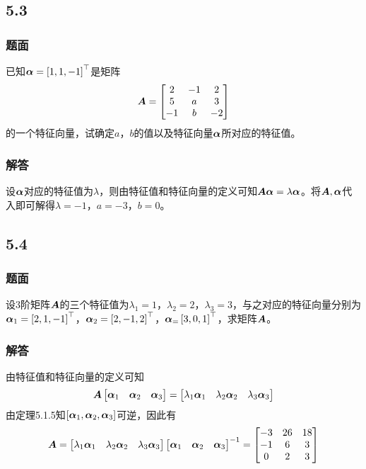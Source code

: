 \documentclass[9pt,xcolor=svgnames]{beamer} %
\begin{document}
\subsection*{5.3}
\begin{frame}
    \frametitle{题面}
    已知\(\boldsymbol{\alpha}=\left[ 1,1,-1 \right]^\top\)是矩阵
    \begin{equation*}
        \boldsymbol{A}=
        \begin{bmatrix}
            2  & -1 & 2  \\
            5  & a  & 3  \\
            -1 & b  & -2
        \end{bmatrix}
    \end{equation*}
    的一个特征向量，试确定\(a\)，\(b\)的值以及特征向量\(\boldsymbol{\alpha}\)所对应的特征值。
\end{frame}

\begin{frame}
    \frametitle{解答}
    设\(\boldsymbol{\alpha}\)对应的特征值为\(\lambda\)，则由特征值和特征向量的定义可知\(\boldsymbol{A}\boldsymbol{\alpha}=\lambda\boldsymbol{\alpha}\)。将\(\boldsymbol{A},\boldsymbol{\alpha}\)代入即可解得\(\lambda=-1\)，\(a=-3\)，\(b=0\)。
\end{frame}

\subsection*{5.4}
\begin{frame}
    \frametitle{题面}
    设\(3\)阶矩阵\(\boldsymbol{A}\)的三个特征值为\(\lambda_1=1\)，\(\lambda_2=2\)，\(\lambda_3=3\)，与之对应的特征向量分别为\(\boldsymbol{\alpha}_1=\left[ 2,1,-1 \right]^\top\)，\(\boldsymbol{\alpha}_2=\left[ 2,-1,2 \right]^\top\)，\(\boldsymbol{\alpha}_=\left[ 3,0,1 \right]^\top\)，求矩阵\(\boldsymbol{A}\)。
\end{frame}

\begin{frame}
    \frametitle{解答}
    由特征值和特征向量的定义可知
    \begin{equation*}
        \boldsymbol{A}\begin{bmatrix}\boldsymbol{\alpha}_1&\boldsymbol{\alpha}_2&\boldsymbol{\alpha}_3\end{bmatrix}=\begin{bmatrix}\lambda_1\boldsymbol{\alpha}_1&\lambda_2\boldsymbol{\alpha}_2&\lambda_3\boldsymbol{\alpha}_3\end{bmatrix}
    \end{equation*}
    \pause
    由定理5.1.5知\(\left[ \boldsymbol{\alpha}_1,\boldsymbol{\alpha}_2,\boldsymbol{\alpha}_3 \right]\)可逆，因此有
    \begin{equation*}
        \boldsymbol{A}=\begin{bmatrix}\lambda_1\boldsymbol{\alpha}_1&\lambda_2\boldsymbol{\alpha}_2&\lambda_3\boldsymbol{\alpha}_3\end{bmatrix}{\begin{bmatrix}\boldsymbol{\alpha}_1&\boldsymbol{\alpha}_2&\boldsymbol{\alpha}_3\end{bmatrix}}^{-1}=
        \begin{bmatrix}
            -3 & 26 & 18 \\
            -1 & 6  & 3  \\
            0  & 2  & 3
        \end{bmatrix}
    \end{equation*}
\end{frame}
\end{document}
